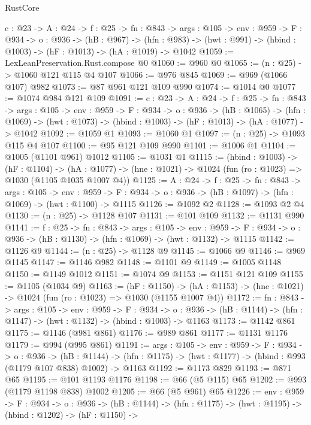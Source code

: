 \begin{lexlean}{RustCore}
\begin{coremodule}
  {c : @23} ->
  {A : @24} ->
  {f : @25} ->
  {fn : @843} ->
  {args : @105} ->
  {env : @959} ->
  {F : @934} ->
  {o : @936} ->
  (hB : @967) ->
  (hfn : @983) -> (hwt : @991) -> (hbind : @1003) -> (hF : @1013) -> (hA : @1019) -> @1042
@1059 := LexLeanPreservation.Rust.compose @0
@1060 := @960 @0
@1065 := (n : @25) -> @1060 @121 @115 @4 @107
@1066 := @976 @845
@1069 := @969 (@1066 @107) @982
@1073 := @87 @961 @121 @109 @990
@1074 := @1014 @0
@1077 := @1074 @984 @121 @109
@1091 := {c : @23} ->
  {A : @24} ->
  {f : @25} ->
  {fn : @843} ->
  {args : @105} ->
  {env : @959} ->
  {F : @934} ->
  {o : @936} ->
  (hB : @1065) ->
  (hfn : @1069) -> (hwt : @1073) -> (hbind : @1003) -> (hF : @1013) -> (hA : @1077) -> @1042
@1092 := @1059 @1
@1093 := @1060 @1
@1097 := (n : @25) -> @1093 @115 @4 @107
@1100 := @95 @121 @109 @990
@1101 := @1006 @1
@1104 := @1005 (@1101 @961) @1012
@1105 := @1031 @1
@1115 := (hbind : @1003) ->
  (hF : @1104) ->
  (hA : @1077) -> (hne : @1021) -> @1024 (fun (ro : @1023) => @1030 (@1105 @1035 @1007 @4))
@1125 := {A : @24} ->
  {f : @25} ->
  {fn : @843} ->
  {args : @105} ->
  {env : @959} ->
  {F : @934} -> {o : @936} -> (hB : @1097) -> (hfn : @1069) -> (hwt : @1100) -> @1115
@1126 := @1092 @2
@1128 := @1093 @2 @4
@1130 := (n : @25) -> @1128 @107
@1131 := @101 @109
@1132 := @1131 @990
@1141 := {f : @25} ->
  {fn : @843} ->
  {args : @105} ->
  {env : @959} ->
  {F : @934} -> {o : @936} -> (hB : @1130) -> (hfn : @1069) -> (hwt : @1132) -> @1115
@1142 := @1126 @9
@1144 := (n : @25) -> @1128 @9
@1145 := @1066 @9
@1146 := @969 @1145
@1147 := @1146 @982
@1148 := @1101 @9
@1149 := @1005 @1148
@1150 := @1149 @1012
@1151 := @1074 @9
@1153 := @1151 @121 @109
@1155 := @1105 (@1034 @9)
@1163 := (hF : @1150) ->
  (hA : @1153) -> (hne : @1021) -> @1024 (fun (ro : @1023) => @1030 (@1155 @1007 @4))
@1172 := {fn : @843} ->
  {args : @105} ->
  {env : @959} ->
  {F : @934} ->
  {o : @936} -> (hB : @1144) -> (hfn : @1147) -> (hwt : @1132) -> (hbind : @1003) -> @1163
@1173 := @1142 @861
@1175 := @1146 (@981 @861)
@1176 := @989 @861
@1177 := @1131 @1176
@1179 := @994 (@995 @861)
@1191 := {args : @105} ->
  {env : @959} ->
  {F : @934} ->
  {o : @936} ->
  (hB : @1144) -> (hfn : @1175) -> (hwt : @1177) -> (hbind : @993 (@1179 @107 @838) @1002) -> @1163
@1192 := @1173 @829
@1193 := @871 @65
@1195 := @101 @1193 @1176
@1198 := @66 (@5 @115) @65
@1202 := @993 (@1179 @1198 @838) @1002
@1205 := @66 (@5 @961) @65
@1226 := {env : @959} ->
  {F : @934} ->
  {o : @936} ->
  (hB : @1144) ->
  (hfn : @1175) ->
  (hwt : @1195) ->
  (hbind : @1202) ->
  (hF : @1150) ->

\end{coremodule}
\end{lexlean}
